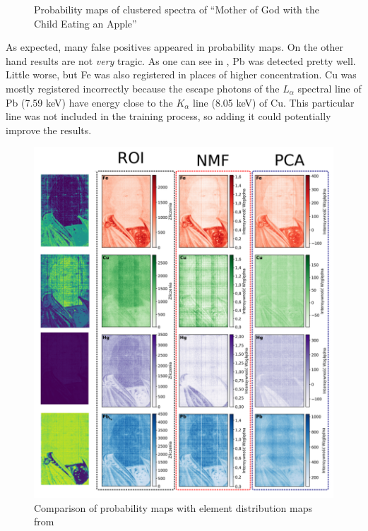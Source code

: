 \begin{figure}[htbp!]
  \centering
  
  \caption{Probability maps of clustered spectra of ``Mother of
God with the Child Eating an Apple''}
  \label{fig:clusters-prob-matka-boska}
\end{figure}

As expected, many false positives appeared in probability maps.
On the other hand results are not \emph{very} tragic. 
As one can see in , Pb was detected pretty well.
Little worse, but Fe was also registered in places of higher concentration.
Cu was mostly registered incorrectly because the escape photons of the $L_{\alpha}$ spectral line of Pb (7.59 keV) have energy close to the $K_{\alpha}$ line (8.05 keV) of Cu. 
This particular line was not included in the training process, so adding it could potentially improve the results.

\begin{figure}[htbp!]
  \centering
  \includegraphics[width=1\textwidth]{img/comparison-lach.png}
  \caption{Comparison of probability maps with element distribution maps from \cite{Lach2022}}
  \label{fig:lach-comparison}
\end{figure}

